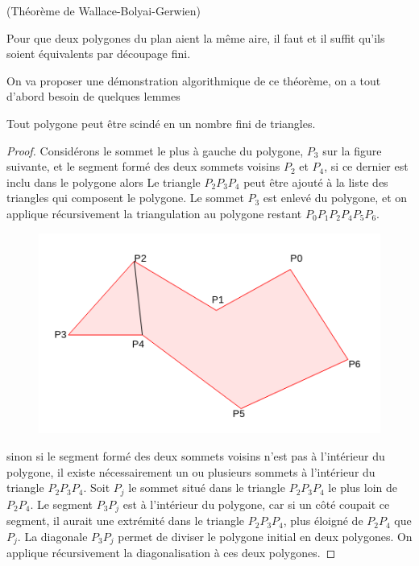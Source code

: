 \begin{kkk}(Théorème de Wallace-Bolyai-Gerwien)\label{wbg}\cite{cite6}
  \hfill

\noindent
Pour que deux polygones du plan aient la même aire, il faut et il suffit qu'ils soient équivalents par découpage fini.
\end{kkk}
\noindent
On va proposer une démonstration algorithmique de ce théorème, on a tout d'abord besoin de quelques lemmes
\begin{li}
Tout polygone peut être scindé en un nombre fini de triangles.
\end{li}
\begin{proof}
  \hfill

  \noindent
  Considérons le sommet le plus à gauche du polygone, $P_3$ sur la figure suivante, et le segment formé des deux sommets voisins $P_2$ et $P_4$, si ce dernier est inclu dans le polygone alors Le triangle $P_2P_3P_4$ peut être ajouté à la liste des triangles qui composent le polygone. Le sommet $P_3$ est enlevé du polygone, et on applique récursivement la triangulation au polygone restant $P_0P_1P_2P_4P_5P_6$.
  \begin{figure}[h]
      \centering
      \includegraphics[scale=0.6]{images/x5.png}

  \end{figure}

\noindent
sinon si le segment formé des deux sommets voisins n'est pas à l'intérieur du polygone, il existe nécessairement un ou plusieurs sommets à
l'intérieur du triangle $P_2P_3P_4$. Soit $P_j$ le sommet situé dans le triangle $P_2P_3P_4$ le plus loin de $P_2P_4$. Le segment $P_3P_j$ est à l'intérieur du polygone, car si un côté coupait ce segment, il aurait une extrémité dans le triangle $P_2P_3P_4$, plus éloigné de $P_2P_4$ que $P_j$.
\newpage
La diagonale $P_3P_j$ permet de diviser le polygone initial en deux polygones. On applique récursivement la diagonalisation à ces deux polygones.


\end{proof}
